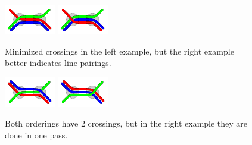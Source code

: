 \documentclass[sigconf]{acmart}
\begin{document}
\begin{figure}[t]
\vspace{-.5em}
\centering
\begin{minipage}{.472\textwidth}
  \centering
	\includegraphics[trim={2.25 2.2 2.25 2.2},clip,width=.32\textwidth]{render_examples/splitting_example_nonopt.pdf}\hspace{28pt}
	\includegraphics[trim={2.25 2.2 2.25 2.2},clip,width=.32\textwidth]{render_examples/splitting_example.pdf}
	\caption{Minimized crossings in the left example, but the right example better indicates line pairings.}
	\label{FIG:linesplitting}
\end{minipage}%
\hfill
\begin{minipage}{.472\textwidth}
  \centering
	\includegraphics[trim={2.25 2.2 2.25 2.2},clip,width=.32\textwidth]{render_examples/splitting_example2_nonopt.pdf}\hspace{28pt}
	\includegraphics[trim={2.25 2.2 2.25 2.2},clip,width=.32\textwidth]{render_examples/splitting_example2.pdf}
	\caption{Both orderings have 2 crossings, but in the right example they are done in one pass.}
	\label{FIG:linesplitting2}
\end{minipage}
\vspace{-1em}
\end{figure}
\end{document}

